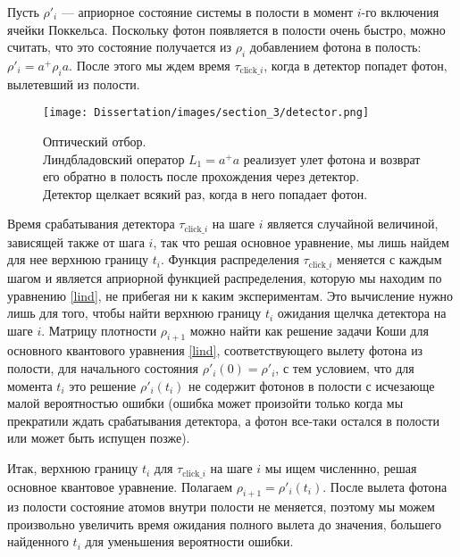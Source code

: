 Пусть $\rho'_{i}$ --- априорное состояние системы в полости в момент $i$-го включения ячейки Поккельса. Поскольку фотон появляется в полости очень быстро, можно считать, что это состояние получается из $\rho_i$ добавлением фотона в полость: $\rho'_i=a^+\rho_ia$. После этого мы ждем время $\tau_{\text{click}\_i}$, когда в детектор попадет фотон, вылетевший из полости. 

\begin{figure}[bt]
	\noindent\centering\texttt{[image: Dissertation/images/section\_3/detector.png]}
	\captionsetup{format=hang,width=0.85\textwidth,justification=centering,singlelinecheck=no}
	\caption{Оптический отбор.\\Линдбладовский оператор $L_{1} = a^{+}a$ реализует улет фотона и возврат его обратно в полость после прохождения через детектор.\\ Детектор щелкает всякий раз, когда в него попадает фотон.}
	\label{fig:2}
\end{figure}

Время срабатывания детектора $\tau_{\text{click}\_i}$ на шаге $i$ является случайной величиной, зависящей также от шага $i$, так что решая основное уравнение, мы лишь найдем для нее верхнюю границу $t_i$. Функция распределения $\tau_{\text{click}\_i}$ меняется с каждым шагом и является априорной функцией распределения, которую мы находим по уравнению \eqref{lind}, не прибегая ни к каким экспериментам. Это вычисление нужно лишь для того, чтобы найти верхнюю границу $t_i$ ожидания щелчка детектора на шаге $i$. Матрицу плотности $\rho_{i+1}$ можно найти как решение задачи Коши для основного квантового уравнения \eqref{lind}, соответствующего вылету фотона из полости, для начального состояния $\rho'_i(0)=\rho'_i$, с тем условием, что для момента $t_{i}$ это решение $\rho'_i(t_{i})$ не содержит фотонов в полости с исчезающе малой вероятностью ошибки  (ошибка может произойти только когда мы прекратили ждать срабатывания детектора, а фотон все-таки остался в полости или может быть испущен позже).

Итак, верхнюю границу $t_i$ для $\tau_{\text{click}\_i}$ на шаге $i$ мы ищем численнно, решая основное квантовое уравнение. Полагаем $\rho_{i+1}=\rho'_i(t_{i})$. После вылета фотона из полости состояние атомов внутри полости не меняется, поэтому мы можем произвольно увеличить время ожидания полного вылета до значения, большего найденного $t_i$ для уменьшения вероятности ошибки.

